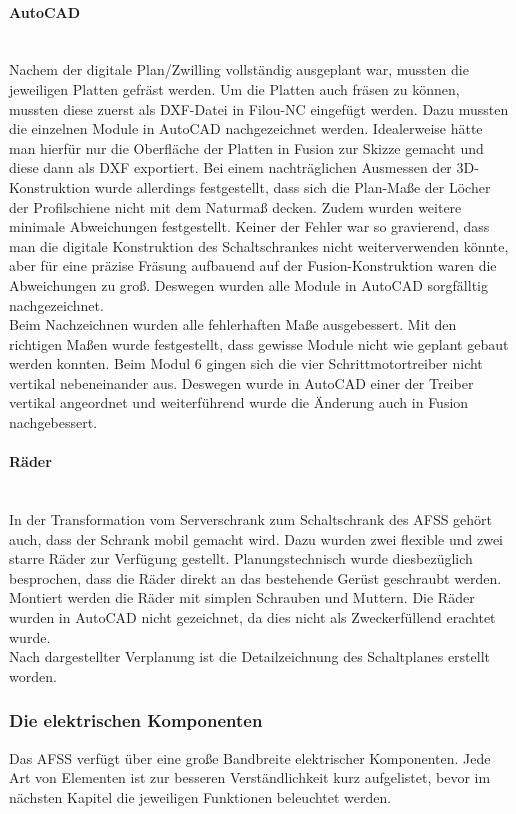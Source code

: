     \paragraph{AutoCAD}\mbox{}\\
    \label{AutoCAD}
    Nachem der digitale Plan/Zwilling vollständig ausgeplant war, mussten die jeweiligen Platten gefräst werden. Um die Platten auch fräsen zu können, mussten diese zuerst als DXF-Datei in Filou-NC eingefügt werden. Dazu mussten die einzelnen Module in AutoCAD nachgezeichnet werden. Idealerweise hätte man hierfür nur die Oberfläche der Platten in Fusion zur Skizze gemacht und diese dann als DXF exportiert. Bei einem nachträglichen Ausmessen der 3D-Konstruktion wurde allerdings festgestellt, dass sich die Plan-Maße der Löcher der Profilschiene nicht mit dem Naturmaß decken. Zudem wurden weitere minimale Abweichungen festgestellt. Keiner der Fehler war so gravierend, dass man die digitale Konstruktion des Schaltschrankes nicht weiterverwenden könnte, aber für eine präzise Fräsung aufbauend auf der Fusion-Konstruktion waren die Abweichungen zu groß. Deswegen wurden alle Module in AutoCAD sorgfälltig nachgezeichnet.\\     
    Beim Nachzeichnen wurden alle fehlerhaften Maße ausgebessert. Mit den richtigen Maßen wurde festgestellt, dass gewisse Module nicht wie geplant gebaut werden konnten. Beim Modul 6 gingen sich die vier Schrittmotortreiber nicht vertikal nebeneinander aus. Deswegen wurde in AutoCAD einer der Treiber vertikal angeordnet und weiterführend wurde die Änderung auch in Fusion nachgebessert.
    \paragraph{Räder}\mbox{}\\
    In der Transformation vom Serverschrank zum Schaltschrank des AFSS gehört auch, dass der Schrank mobil gemacht wird. Dazu wurden zwei flexible und zwei starre Räder zur Verfügung gestellt. Planungstechnisch wurde diesbezüglich besprochen, dass die Räder direkt an das bestehende Gerüst geschraubt werden. Montiert werden die Räder mit simplen Schrauben und Muttern. Die Räder wurden in AutoCAD nicht gezeichnet, da dies nicht als Zweckerfüllend erachtet wurde.\\
    Nach dargestellter Verplanung ist die Detailzeichnung des Schaltplanes erstellt worden.
    \newpage
\subsubsection{Die elektrischen Komponenten}
\label{sec:Die elektrischen Komponenten}
    Das AFSS verfügt über eine große  Bandbreite elektrischer Komponenten. Jede Art von Elementen ist zur besseren Verständlichkeit kurz aufgelistet, bevor im nächsten Kapitel die jeweiligen Funktionen beleuchtet werden.
